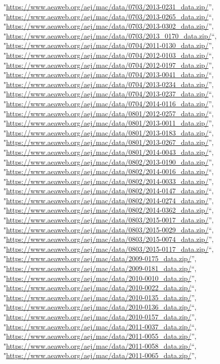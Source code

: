 \documentclass[]{article}
\begin{document}
\begin{itemize}
  "\url{https://www.aeaweb.org/aej/mac/data/0703/2013-0231_data.zip/}'',
  "\url{https://www.aeaweb.org/aej/mac/data/0703/2013-0265_data.zip/}``,
  "\url{https://www.aeaweb.org/aej/mac/data/0703/2013-0302_data.zip/}'',
  "\url{https://www.aeaweb.org/aej/mac/data/0703/2013_0170_data.zip/}``,
  "\url{https://www.aeaweb.org/aej/mac/data/0704/2011-0130_data.zip/}'',
  "\url{https://www.aeaweb.org/aej/mac/data/0704/2012-0103_data.zip/}``,
  "\url{https://www.aeaweb.org/aej/mac/data/0704/2012-0197_data.zip/}'',
  "\url{https://www.aeaweb.org/aej/mac/data/0704/2013-0041_data.zip/}``,
  "\url{https://www.aeaweb.org/aej/mac/data/0704/2013-0234_data.zip/}'',
  "\url{https://www.aeaweb.org/aej/mac/data/0704/2013-0237_data.zip/}``,
  "\url{https://www.aeaweb.org/aej/mac/data/0704/2014-0116_data.zip/}'',
  "\url{https://www.aeaweb.org/aej/mac/data/0801/2012-0257_data.zip/}``,
  "\url{https://www.aeaweb.org/aej/mac/data/0801/2013-0011_data.zip/}'',
  "\url{https://www.aeaweb.org/aej/mac/data/0801/2013-0183_data.zip/}``,
  "\url{https://www.aeaweb.org/aej/mac/data/0801/2013-0267_data.zip/}'',
  "\url{https://www.aeaweb.org/aej/mac/data/0801/2014-0043_data.zip/}``,
  "\url{https://www.aeaweb.org/aej/mac/data/0802/2013-0190_data.zip/}'',
  "\url{https://www.aeaweb.org/aej/mac/data/0802/2014-0016_data.zip/}``,
  "\url{https://www.aeaweb.org/aej/mac/data/0802/2014-0033_data.zip/}'',
  "\url{https://www.aeaweb.org/aej/mac/data/0802/2014-0147_data.zip/}``,
  "\url{https://www.aeaweb.org/aej/mac/data/0802/2014-0274_data.zip/}'',
  "\url{https://www.aeaweb.org/aej/mac/data/0802/2014-0362_data.zip/}``,
  "\url{https://www.aeaweb.org/aej/mac/data/0803/2015-0017_data.zip/}'',
  "\url{https://www.aeaweb.org/aej/mac/data/0803/2015-0029_data.zip/}``,
  "\url{https://www.aeaweb.org/aej/mac/data/0803/2015-0074_data.zip/}'',
  "\url{https://www.aeaweb.org/aej/mac/data/0803/2015-0117_data.zip/}``,
  "\url{https://www.aeaweb.org/aej/mac/data/2009-0175_data.zip/}'',
  "\url{https://www.aeaweb.org/aej/mac/data/2009-0181_data.zip/}``,
  "\url{https://www.aeaweb.org/aej/mac/data/2010-0010_data.zip/}'',
  "\url{https://www.aeaweb.org/aej/mac/data/2010-0022_data.zip/}``,
  "\url{https://www.aeaweb.org/aej/mac/data/2010-0135_data.zip/}'',
  "\url{https://www.aeaweb.org/aej/mac/data/2010-0136_data.zip/}``,
  "\url{https://www.aeaweb.org/aej/mac/data/2010-0157_data.zip/}'',
  "\url{https://www.aeaweb.org/aej/mac/data/2011-0037_data.zip/}``,
  "\url{https://www.aeaweb.org/aej/mac/data/2011-0055_data.zip/}'',
  "\url{https://www.aeaweb.org/aej/mac/data/2011-0058_data.zip/}``,
  "\url{https://www.aeaweb.org/aej/mac/data/2011-0065_data.zip/}'',

\end{itemize}
\end{document}
